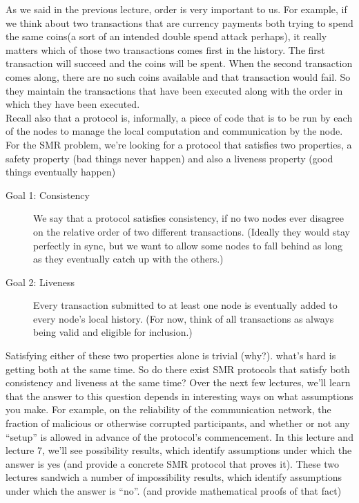 As we said in the previous lecture, order is very important to us. 
For example, if
we think about two transactions that are
currency payments both trying to spend
the same coins(a sort of an intended
double spend attack perhaps), it really
matters which of those two transactions
comes first in the history. The first
transaction will succeed and the coins
will be spent. When the second
transaction comes along, there are no such coins available and that transaction
would fail. So they maintain the
transactions that have been executed
along with the order in which they have
been executed.\\

Recall also that a protocol is, informally, a piece of code that is to be run by each of the
nodes to manage the local computation and communication by the node. For the SMR
problem, we’re looking for a protocol that satisfies two properties, a safety property (bad
things never happen) and also a liveness property (good things eventually happen)\\

\begin{description}
    \item[Goal 1: Consistency] We say that a protocol satisfies consistency, if no two nodes ever
disagree on the relative order of two different transactions. (Ideally they would stay perfectly
in sync, but we want to allow some nodes to fall behind as long as they eventually catch up
with the others.)

    \item[Goal 2: Liveness] Every transaction submitted to at least one node is eventually added
to every node’s local history. (For now, think of all transactions as always being valid and
eligible for inclusion.)
\end{description}

Satisfying either of these two properties alone is trivial (why?). what’s hard is getting
both at the same time. So do there exist SMR protocols that satisfy both consistency and
liveness at the same time? Over the next few lectures, we’ll learn that the answer to this question depends
in interesting ways on what assumptions you make. For example, on the reliability of the
communication network, the fraction of malicious or otherwise corrupted participants, and
whether or not any “setup” is allowed in advance of the protocol’s commencement. In
this lecture and lecture 7, we’ll see possibility results, which identify assumptions under which the
answer is yes (and provide a concrete SMR protocol that proves it). These two lectures
sandwich a number of impossibility results, which identify assumptions under which the
answer is “no”. (and provide mathematical proofs of that fact)


